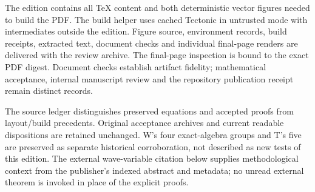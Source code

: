 The edition contains all TeX content and both deterministic vector figures needed to build the PDF. The build helper uses cached Tectonic in untrusted mode with intermediates outside the edition. Figure source, environment records, build receipts, extracted text, document checks and individual final-page renders are delivered with the review archive. The final-page inspection is bound to the exact PDF digest. Document checks establish artifact fidelity; mathematical acceptance, internal manuscript review and the repository publication receipt remain distinct records.

The source ledger distinguishes preserved equations and accepted proofs from layout/build precedents. Original acceptance archives and current readable dispositions are retained unchanged. W's four exact-algebra groups and T's five are preserved as separate historical corroboration, not described as new tests of this edition. The external wave-variable citation below supplies methodological context from the publisher's indexed abstract and metadata; no unread external theorem is invoked in place of the explicit proofs.
